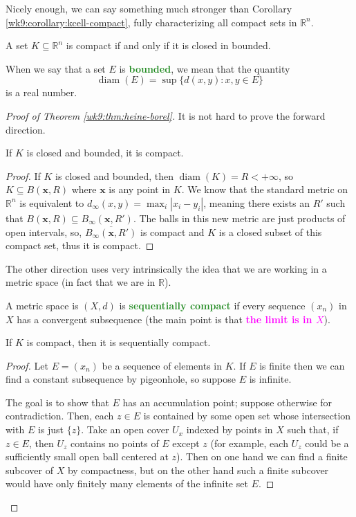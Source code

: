 \documentclass[10pt]{scrartcl}
\providecommand{\ol}{\overline}
\providecommand{\RR}{\mathbb R}
\providecommand{\alert}[1]{{\sffamily\textbf{\textcolor{magenta}{#1}}}}
\providecommand{\opname}{\operatorname}
\providecommand{\mb}[1]{\mathbf{#1}}
\providecommand{\vocab}[1]{{\textbf{\textcolor{ForestGreen}{#1}}}}
\begin{document}
Nicely enough, we can say something much stronger than Corollary
\ref{wk9:corollary:kcell-compact}, fully characterizing
all compact sets in $\RR^n$.
\begin{theorem}\label{wk9:thm:heine-borel}
	A set $K\subseteq\RR^n$ is compact if and only if
	it is closed in bounded.
\end{theorem}

When we say that a set $E$ is \vocab{bounded}, we mean that the quantity
\[\opname{diam}(E) = \sup\{d(x,y):x,y\in E\}\]
is a real number.

\begin{proof}[Proof of Theorem \ref{wk9:thm:heine-borel}]
	It is not hard to prove the forward direction.
	\begin{lemma}
		If $K$ is closed and bounded, it is compact.
	\end{lemma}
	\begin{proof}
		If $K$ is closed and bounded, then $\opname{diam}(K) = R < +\infty$,
	so $K\subseteq B(\mb x,R)$ where $\mb x$ is any point in $K$.
	We know that the standard metric on $\RR^n$ is equivalent to
	$d_{\infty}(x,y) = \max_i|x_i - y_i|$, meaning
	there exists an $R'$ such that
	$B(\mb x, R)\subseteq B_\infty(\mb x, R')$.
	The balls in this new metric are just products of open intervals,
	so, $\ol{B_\infty(\mb x,R')}$ is compact
	and $K$ is a closed subset of this compact set,
	thus it is compact.
	\end{proof}
	
	The other direction uses very intrinsically the idea that
	we are working in a metric space (in fact that we are in $\RR$).
	\begin{definition}\label{wk9:thm:sequential-compactness}
		A metric space is $(X, d)$ is \vocab{sequentially compact} if
		every sequence $(x_n)$ in $X$ has a convergent subsequence
		(the main point is that \alert{the limit is in $X$}).
	\end{definition}

	\begin{lemma}\label{wk9:lemma:seq-compact-if-compact}
		If $K$ is compact, then it is sequentially compact.
	\end{lemma}
	\begin{proof}
		Let $E = (x_n)$ be a sequence of elements in $K$. If $E$ is finite
		then we can find a constant subsequence by pigeonhole,
		so suppose $E$ is infinite.
		
		The goal is to show that $E$ has an accumulation point;
		suppose otherwise for contradiction.
		Then, each $z\in E$ is contained by some open set
		whose intersection with $E$ is just $\{z\}$.
		Take an open cover $U_x$ indexed by points in $X$
		such that, if $z\in E$, then $U_z$ contains no points of $E$
		except $z$ (for example, each $U_z$ could be a sufficiently small
		open ball centered at $z$).
		Then on one hand we can find a finite subcover of $X$ by compactness,
		but on the other hand such a finite subcover
		would have only finitely many elements of the infinite set $E$.
	\end{proof}


\end{proof}
\end{document}
